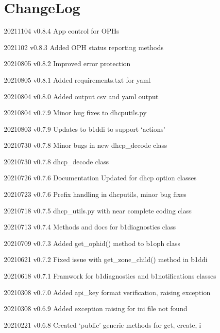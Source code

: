 \documentclass[letterpaper,10pt,english]{sphinxmanual}
\begin{document}
\chapter{ChangeLog}
\label{\detokenize{version_history:changelog}}\label{\detokenize{version_history::doc}}
\begin{DUlineblock}{0em}
\item[]
\begin{DUlineblock}{\DUlineblockindent}
\item[] 20211104        v0.8.4  App control for OPHs
\item[] 2021102         v0.8.3  Added OPH status reporting methods
\item[] 20210805        v0.8.2  Improved error protection
\item[] 20210805        v0.8.1  Added requirements.txt for yaml
\item[] 20210804        v0.8.0  Added output csv and yaml output
\item[] 20210804        v0.7.9  Minor bug fixes to dhcputils.py
\item[] 20210803        v0.7.9  Updates to b1ddi to support ‘actions’
\item[] 20210730        v0.7.8  Minor bugs in new dhcp\_decode class
\item[] 20210730        v0.7.8  dhcp\_decode class
\item[] 20210726        v0.7.6  Documentation Updated for dhcp option classes
\item[] 20210723        v0.7.6  Prefix handling in dhcputils, minor bug fixes
\item[] 20210718        v0.7.5  dhcp\_utils.py with near complete coding class
\end{DUlineblock}
\item[] 20210713    v0.7.4  Methods and docs for b1diagnostics class
\item[] 20210709    v0.7.3  Added get\_ophid() method to b1oph class
\item[] 20210621    v0.7.2  Fixed issue with get\_zone\_child() method in b1ddi
\item[] 20210618    v0.7.1  Framwork for b1diagnostics and b1notifications classes
\item[] 20210308    v0.7.0  Added api\_key format verification, raising exception
\item[] 20210308    v0.6.9  Added exception raising for ini file not found
\item[] 20210221    v0.6.8  Created ‘public’ generic methods for get, create, i

\end{DUlineblock}
\end{document}
